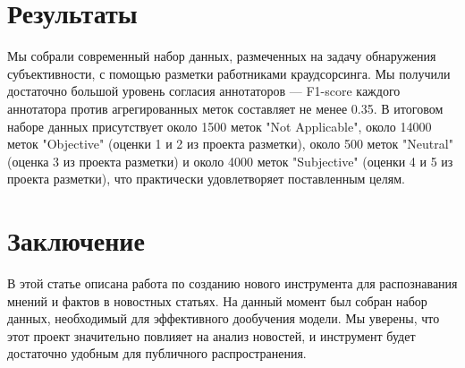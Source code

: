 \documentclass[conference]{IEEEtran}
\begin{document}
\section{Результаты}
Мы собрали современный набор данных, размеченных на задачу обнаружения субъективности, с помощью разметки работниками краудсорсинга. Мы получили достаточно большой уровень согласия аннотаторов --- F1-score каждого аннотатора против агрегированных меток составляет не менее 0.35. В итоговом наборе данных присутствует около 1500 меток "Not Applicable", около 14000 меток "Objective" (оценки 1 и 2 из проекта разметки), около 500 меток "Neutral" (оценка 3 из проекта разметки) и около 4000 меток "Subjective" (оценки 4 и 5 из проекта разметки), что практически удовлетворяет поставленным целям.

\section{Заключение}
В этой статье описана работа по созданию нового инструмента для распознавания мнений и фактов в новостных статьях. На данный момент был собран набор данных, необходимый для эффективного дообучения модели. Мы уверены, что этот проект значительно повлияет на анализ новостей, и инструмент будет достаточно удобным для публичного распространения.



\end{document}
